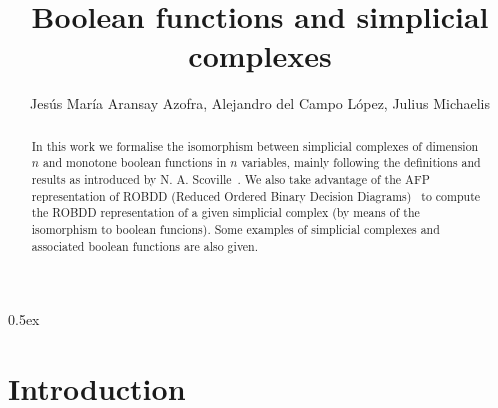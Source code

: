 \documentclass[11pt,a4paper]{article}
\begin{document}
\title{Boolean functions and simplicial complexes}
\author{Jesús María Aransay Azofra, Alejandro del Campo López, Julius Michaelis}
\maketitle

\begin{abstract}
  In this work we formalise the isomorphism between 
  simplicial complexes of dimension $n$ and 
  monotone boolean functions in $n$ variables, 
  mainly following the definitions and results
  as introduced by N. A. Scoville~\cite[Ch. 6]{SC19}.
  We also take advantage of the AFP representation
  of ROBDD (Reduced Ordered Binary Decision 
    Diagrams)~\cite{ROBDD-AFP}
  to compute the ROBDD representation 
  of a given simplicial complex (by means of the isomorphism
  to boolean funcions). Some examples of simplicial complexes 
  and associated boolean functions are also given.
\end{abstract}

\tableofcontents

\parindent 0pt\parskip 0.5ex

\section{Introduction}







\end{document}
